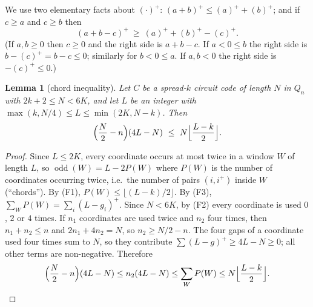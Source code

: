 \documentclass[11pt]{article}
\newtheorem{lemma}{Lemma}
\theoremstyle{remark}
\newcommand{\odd}{\operatorname{odd}}
\newcommand{\pos}[1]{(#1)^{+}}
\begin{document}
\medskip We use two elementary facts about $\pos{\cdot}$: $\pos{a+b}\le\pos a+\pos b$; and if $c\ge a$ and $c\ge b$ then
\begin{equation}\label{el} \pos{a+b-c}\ \ge\ \pos a+\pos b-\pos c . \end{equation}
(If $a,b\ge 0$ then $c\ge0$ and the right side is $a+b-c$. If $a<0\le b$ the right side is $b-\pos c= b-c\le 0$; similarly
for $b<0\le a$. If $a,b<0$ the right side is $-\pos c\le 0$.)

\begin{lemma}[chord inequality]\label{L1}
Let $C$ be a spread-$k$ circuit code of length $N$ in $Q_n$ with $2k+2\le N<6K$, and let $L$ be an integer with
$\max(k,N/4)\le L\le\min(2K,N-k)$. Then
\[ \Bigl(\frac N2-n\Bigr)(4L-N)\ \le\ N\Bigl\lfloor\frac{L-k}{2}\Bigr\rfloor . \]
\end{lemma}
\begin{proof}
Since $L\le 2K$, every coordinate occurs at most twice in a window $W$ of length $L$, so $\odd(W)=L-2P(W)$ where
$P(W)$ is the number of coordinates occurring twice, i.e.\ the number of pairs $(i,i^+)$ inside $W$ (``chords'').
By (F1), $P(W)\le\lfloor (L-k)/2\rfloor$. By (F3), $\sum_W P(W)=\sum_i\pos{L-g_i}$.
Since $N<6K$, by (F2) every coordinate is used $0$, $2$ or $4$ times. If $n_1$ coordinates are used twice and $n_2$ four times,
then $n_1+n_2\le n$ and $2n_1+4n_2=N$, so $n_2\ge N/2-n$. The four gaps of a coordinate used four times sum to $N$, so
they contribute $\sum\pos{L-g}\ge 4L-N\ge 0$; all other terms are non-negative. Therefore
\[ \Bigl(\frac N2-n\Bigr)(4L-N)\le n_2(4L-N)\le\sum_W P(W)\le N\Bigl\lfloor\frac{L-k}{2}\Bigr\rfloor. \qedhere\]
\end{proof}
\end{document}
